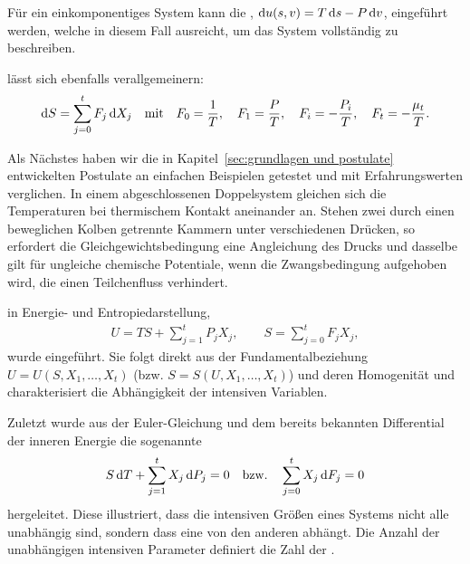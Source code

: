 \begin{summary}
    Für ein einkomponentiges System kann die , ${\mathop{}\!\mathrm{d} u(s,v)=T\mathop{}\!\mathrm{d} s-P\mathop{}\!\mathrm{d} v}$, eingeführt werden, welche in diesem Fall ausreicht, um das System vollständig zu beschreiben.

    lässt sich ebenfalls verallgemeinern:
    \begin{align*}
        \mathop{}\!\mathrm{d} S=\sum_{j=0}^{t}F_j\mathop{}\!\mathrm{d} X_j\quad \mathrm{mit}\quad F_0=\frac{1}{T}, \quad F_1=\frac{P}{T}, \quad F_i=-\frac{P_i}{T},\quad F_t=-\frac{\mu_t}{T}.
    \end{align*}

    Als Nächstes haben wir die in Kapitel~\ref{sec:grundlagen und postulate} entwickelten Postulate an einfachen Beispielen getestet und mit Erfahrungswerten verglichen. In einem abgeschlossenen Doppelsystem gleichen sich die Temperaturen bei thermischem Kontakt aneinander an. Stehen zwei durch einen beweglichen Kolben getrennte Kammern unter verschiedenen Drücken, so erfordert die Gleichgewichtsbedingung eine Angleichung des Drucks und dasselbe gilt für ungleiche chemische Potentiale, wenn die Zwangsbedingung aufgehoben wird, die einen Teilchenfluss verhindert. 

     in Energie- und Entropiedarstellung,
    \begin{align*}
        U = TS + \sum_{j=1}^t P_j X_j, \qquad S = \sum_{j=0}^t F_j X_j,
    \end{align*}
    wurde eingeführt. Sie folgt direkt aus der Fundamentalbeziehung $U=U(S, X_1,\dots,X_t)$ (bzw. $S=S(U, X_1,\dots,X_t)$) und deren Homogenität und charakterisiert die Abhängigkeit der intensiven Variablen.
    
    Zuletzt wurde aus der Euler-Gleichung und dem bereits bekannten Differential der inneren Energie die sogenannte 
    \begin{align*}
        S\mathop{}\!\mathrm{d} T + \sum_{j=1}^t X_j \mathop{}\!\mathrm{d} P_j = 0 \quad\mathrm{bzw.}\quad \sum_{j=0}^{t}X_j\mathop{}\!\mathrm{d} F_j=0
    \end{align*}
    hergeleitet. Diese illustriert, dass die intensiven Größen eines Systems nicht alle unabhängig sind, sondern dass eine von den anderen abhängt. Die Anzahl der unabhängigen intensiven Parameter definiert die Zahl der . 
\end{summary}